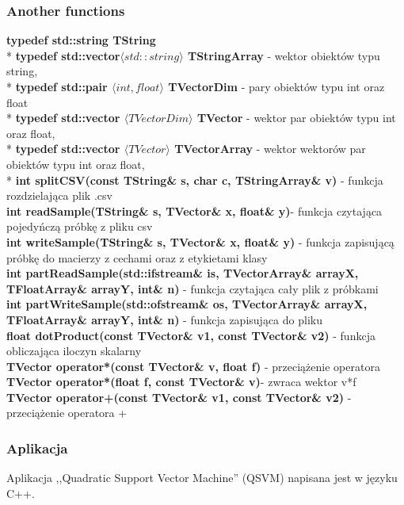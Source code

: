 \documentclass[[10pt,a4paper]{article}
\begin{document}
\begin{enumerate}
\begin{itemize}
\subsubsection{Another functions}
\setlength{\parskip}{1ex plus 0.5ex minus 0.2ex}
\textbf{typedef std::string TString}\\*
\textbf{typedef std::vector$\langle std::string\rangle$ TStringArray} - wektor obiektów typu string,\\*	
\textbf{typedef std::pair $\langle int, float \rangle$ TVectorDim} - pary obiektów typu int oraz float\\*
\textbf{typedef std::vector $\langle TVectorDim \rangle$ TVector }- wektor par obiektów typu int oraz float,\\*
\textbf{typedef std::vector $\langle TVector \rangle$ TVectorArray} - wektor wektorów par obiektów typu int oraz float, \\*
\textbf{int splitCSV(const TString\& s, char c, TStringArray\& v)} - funkcja rozdzielająca plik .csv\\
\textbf{int readSample(TString\& s, TVector\& x, float\& y)}- funkcja czytająca pojedyńczą próbkę z pliku csv\\
\textbf{int writeSample(TString\& s, TVector\& x, float\& y)} - funkcja zapisującą próbkę do macierzy z cechami oraz z etykietami klasy\\
\textbf{int partReadSample(std::ifstream\& is, TVectorArray\& arrayX, TFloatArray\& arrayY, int\& n) }- funkcja czytająca cały plik z próbkami\\
\textbf{int partWriteSample(std::ofstream\& os, TVectorArray\& arrayX, TFloatArray\& arrayY, int\& n)} - funkcja zapisująca do pliku\\
\textbf{float dotProduct(const TVector\& v1, const TVector\& v2)} - funkcja obliczająca iloczyn skalarny\\
\textbf{TVector operator*(const TVector\& v, float f) }- przeciążenie operatora \\
\textbf{TVector operator*(float f, const TVector\& v)}- zwraca wektor v*f\\
\textbf{TVector operator+(const TVector\& v1, const TVector\& v2) }- przeciążenie operatora +\\

\subsubsection{Aplikacja}
\noindent Aplikacja ,,Quadratic Support Vector Machine'' (QSVM) napisana jest w języku C++.


\end{itemize}
\end{enumerate}
\end{document}

